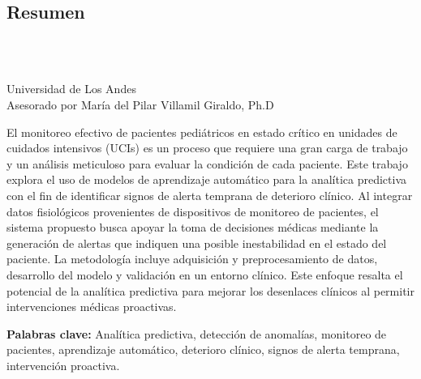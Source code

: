 \begin{titlepage}
  \centering
  \newpage
  \pagestyle{empty}

  \chapter*{Resumen}
  \vspace{0.5cm}

  {\bf\centering \ThesisTitle} \\
  \vspace{0.8cm}

  \begin{flushright}
    \AuthorName \\
    Universidad de Los Andes \\
    Asesorado por María del Pilar Villamil Giraldo, Ph.D
  \end{flushright}

  \vspace{0.8cm}

  \justifying El monitoreo efectivo de pacientes pediátricos en estado crítico en unidades de cuidados intensivos (UCIs) es un proceso que requiere una gran carga de trabajo y un análisis meticuloso para evaluar la condición de cada paciente. Este trabajo explora el uso de modelos de aprendizaje automático para la analítica predictiva con el fin de identificar signos de alerta temprana de deterioro clínico. Al integrar datos fisiológicos provenientes de dispositivos de monitoreo de pacientes, el sistema propuesto busca apoyar la toma de decisiones médicas mediante la generación de alertas que indiquen una posible inestabilidad en el estado del paciente. La metodología incluye adquisición y preprocesamiento de datos, desarrollo del modelo y validación en un entorno clínico. Este enfoque resalta el potencial de la analítica predictiva para mejorar los desenlaces clínicos al permitir intervenciones médicas proactivas.

  \begin{flushleft}
    \vspace{0.5cm}
    \textbf{Palabras clave:} Analítica predictiva, detección de anomalías, monitoreo de pacientes, aprendizaje automático, deterioro clínico, signos de alerta temprana, intervención proactiva.

  \end{flushleft}

\end{titlepage}
